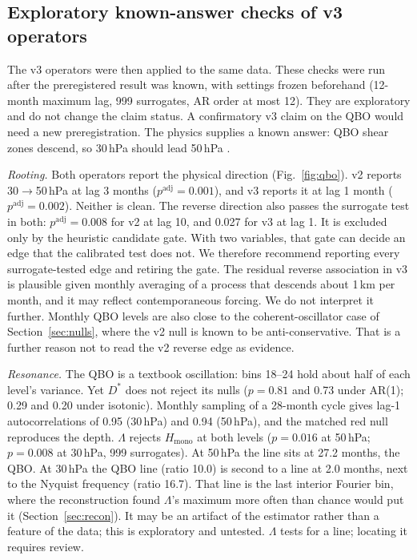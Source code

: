 \documentclass[10pt,twocolumn,letterpaper]{article}
\theoremstyle{definition}
\theoremstyle{remark}
\newcommand{\padj}{p^{\mathrm{adj}}}
\begin{document}
\subsection{Exploratory known-answer checks of v3 operators}

The v3 operators were then applied to the same data. These checks were run
after the preregistered result was known, with settings frozen beforehand
(12-month maximum lag, 999 surrogates, AR order at most 12). They are
exploratory and do not change the claim status. A confirmatory v3 claim on the
QBO would need a new preregistration. The physics supplies a known answer: QBO
shear zones descend, so 30\,hPa should lead 50\,hPa \cite{baldwin}.

\textit{Rooting.} Both operators report the physical direction
(Fig.~\ref{fig:qbo}). v2 reports 30$\to$50\,hPa at lag 3 months ($\padj=0.001$),
and v3 reports it at lag 1 month ($\padj=0.002$). Neither is clean. The reverse
direction also passes the surrogate test in both: $\padj=0.008$ for v2 at lag 10,
and 0.027 for v3 at lag 1. It is excluded only by the heuristic candidate gate.
With two variables, that gate can decide an edge that the calibrated test does
not. We therefore recommend reporting every surrogate-tested edge and retiring
the gate. The residual reverse association in v3 is plausible given monthly
averaging of a process that descends about 1\,km per month, and it may reflect
contemporaneous forcing. We do not interpret it further. Monthly QBO levels are
also close to the coherent-oscillator case of Section~\ref{sec:nulls}, where the
v2 null is known to be anti-conservative. That is a further reason not to read
the v2 reverse edge as evidence.

\textit{Resonance.} The QBO is a textbook oscillation: bins 18--24 hold about half
of each level's variance. Yet $D^*$ does not reject its nulls ($p=0.81$ and
0.73 under AR(1); 0.29 and 0.20 under isotonic). Monthly sampling of a 28-month
cycle gives lag-1 autocorrelations of 0.95 (30\,hPa) and 0.94 (50\,hPa), and the
matched red null reproduces the depth. $\Lambda$ rejects $H_{\mathrm{mono}}$ at
both levels ($p=0.016$ at 50\,hPa; $p=0.008$ at 30\,hPa, 999 surrogates). At
50\,hPa the line sits at 27.2 months, the QBO. At 30\,hPa the QBO line (ratio
10.0) is second to a line at 2.0 months, next to the Nyquist frequency (ratio
16.7). That line is the last interior Fourier bin, where the reconstruction
found $\Lambda$'s maximum more often than chance would put it
(Section~\ref{sec:recon}). It may be an artifact of the estimator rather than a
feature of the data; this is exploratory and untested. $\Lambda$ tests for a
line; locating it requires review.
\end{document}
